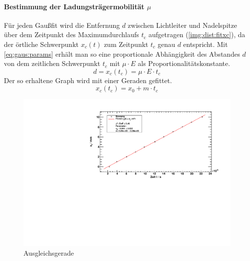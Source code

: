 \paragraph{Bestimmung der Ladungsträgermobilität $\mu$}
Für jeden Gaußfit wird die Entfernung $d$ zwischen Lichtleiter und Nadelspitze über dem Zeitpunkt des Maximumdurchlaufs $t_{\text{c}}$ 
aufgetragen (\autoref{img:dist:fitxc}), da der örtliche Schwerpunkt $x_c(t)$ zum Zeitpunkt $t_c$ genau $d$ entspricht. Mit 
\autoref{eq:gaus:params} erhält man so eine proportionale Abhängigkeit des Abstandes $d$ von dem zeitlichen Schwerpunkt $t_c$ mit 
$\mu \cdot E$ als Proportionalitätskonstante.
\begin{equation}
  d = x_c(t_c) = \mu \cdot E \cdot t_c
\end{equation} 
Der so erhaltene Graph wird mit einer Geraden gefittet.
\begin{equation}
  x_c(t_c) = x_0 + m \cdot t_c
\end{equation}

\begin{figure}[H]
\begin{center}
  \includegraphics[width=\textwidth]{../img/part2/dist_fitXc.pdf}
  \caption{Ausgleichsgerade} %
  \label{img:dist:fitxc}
\end{center}
\end{figure}


